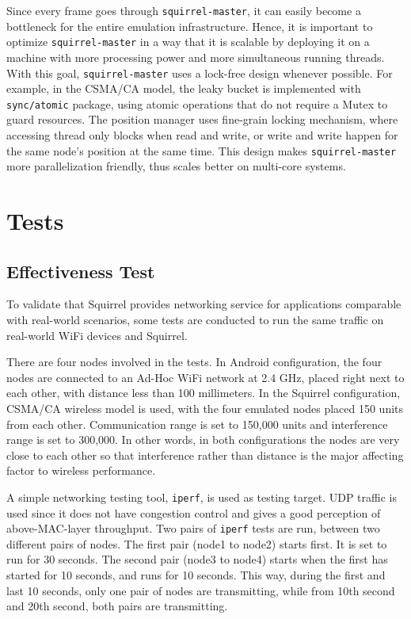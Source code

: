 \documentclass[12pt]{report}
\begin{document}
Since every frame goes through \texttt{squirrel-master}, it can easily become a bottleneck for the entire emulation infrastructure. Hence, it is important to optimize \texttt{squirrel-master} in a way that it is scalable by deploying it on a machine with more processing power and more simultaneous running threads. With this goal, \texttt{squirrel-master} uses a lock-free design whenever possible. For example, in the CSMA/CA model, the leaky bucket is implemented with \texttt{sync/atomic} package, using atomic operations that do not require a Mutex to guard resources. The position manager uses fine-grain locking mechanism, where accessing thread only blocks when read and write, or write and write happen for the same node's position at the same time. This design makes \texttt{squirrel-master} more parallelization friendly, thus scales better on multi-core systems.

\section{Tests}

\subsection{Effectiveness Test}

To validate that Squirrel provides networking service for applications comparable with real-world scenarios, some tests are conducted to run the same traffic on real-world WiFi devices and Squirrel.

There are four nodes involved in the tests. In Android configuration, the four nodes are connected to an Ad-Hoc WiFi network at 2.4 GHz, placed right next to each other, with distance less than 100 millimeters. In the Squirrel configuration, CSMA/CA wireless model is used, with the four emulated nodes placed 150 units from each other. Communication range is set to 150,000 units and interference range is set to 300,000. In other words, in both configurations the nodes are very close to each other so that interference rather than distance is the major affecting factor to wireless performance.

A simple networking testing tool, \texttt{iperf}, is used as testing target. UDP traffic is used since it does not have congestion control and gives a good perception of above-MAC-layer throughput. Two pairs of \texttt{iperf} tests are run, between two different pairs of nodes. The first pair (node1 to node2) starts first. It is set to run for 30 seconds. The second pair (node3 to node4) starts when the first has started for 10 seconds, and runs for 10 seconds. This way, during the first and last 10 seconds, only one pair of nodes are transmitting, while from 10th second and 20th second, both pairs are transmitting.
\end{document}
